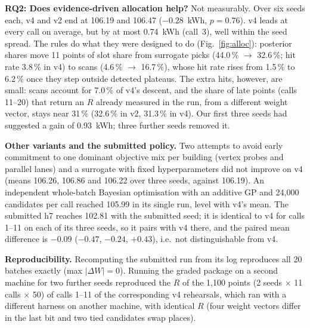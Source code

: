 \textbf{RQ2: Does evidence-driven allocation help?} Not measurably. Over six seeds each, v4 and v2 end at 106.19
and 106.47 ($-0.28$~kWh, $p=0.76$). v4 leads at every call on average, but by at most 0.74~kWh (call~3), well within
the seed spread. The rules do what they were designed to do (Fig.~\ref{fig:alloc}): posterior shares move 11 points of
slot share from surrogate picks (44.0\,\% $\to$ 32.6\,\%; hit rate 3.8\,\% in v4) to scans (4.6\,\% $\to$ 16.7\,\%), whose
hit rate rises from 1.5\,\% to 6.2\,\% once they step outside detected plateaus. The extra hits, however, are small:
scans account for 7.0\,\% of v4's descent, and the share of late points (calls 11--20) that return an $R$ already
measured in the run, from a different weight vector, stays near 31\,\% (32.6\,\% in v2, 31.3\,\% in v4). Our first three seeds had suggested a gain of
0.93~kWh; three further seeds removed it.

\textbf{Other variants and the submitted policy.} Two attempts to avoid early commitment to one dominant objective
mix per building (vertex probes and parallel lanes) and a surrogate with fixed hyperparameters did not improve on v4
(means 106.26, 106.86 and 106.22 over three seeds, against 106.19). An independent whole-batch Bayesian optimisation with an additive
GP and 24,000 candidates per call reached 105.99 in its single run, level with v4's mean. The submitted h7 reaches
102.81 with the submitted seed; it is identical to v4 for calls 1--11 on each of its three seeds, so it pairs with v4
there, and the paired mean difference is $-0.09$ ($-0.47$, $-0.24$, $+0.43$), i.e.\ not distinguishable from v4.

\textbf{Reproducibility.} Recomputing the submitted run from its log reproduces all 20 batches exactly
(max $|\Delta W|=0$). Running the graded package on a second machine for two further seeds reproduced the $R$ of the 1,100 points
(2 seeds $\times$ 11 calls $\times$ 50) of calls 1--11 of the corresponding v4 rehearsals, which ran with a different harness on another machine, with
identical $R$ (four weight vectors differ in the last bit and two tied candidates swap places).
